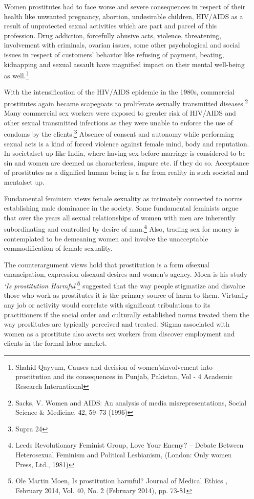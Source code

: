 \begin{multicols}{2}
\noi
Women prostitutes had to face worse and severe consequences in respect of their health like
unwanted pregnancy, abortion, undesirable children, HIV/AIDS as a result of unprotected
sexual activities which are part and parcel of this profession. Drug addiction, forcefully abusive
acts, violence, threatening, involvement with criminals, ovarian issues, some other
psychological and social issues in respect of customers' behavior like refusing of payment,
beating, kidnapping and sexual assault have magnified impact on their mental well-being as
well.\footnote{Shahid Qayyum, Causes and decision of women'sinvolvement into prostitution and its consequences in Punjab, Pakistan, Vol - 4 Academic Research International}

\noi
With the intensification of the HIV/AIDS epidemic in the 1980s, commercial prostitutes again
became scapegoats to proliferate sexually transmitted diseases.\footnote{Sacks, V. Women and AIDS: An analysis of media misrepresentations, Social Science \& Medicine, 42, 59–73 (1996)} Many commercial sex
workers were exposed to greater risk of HIV/AIDS and other sexual transmitted infections as
they were unable to enforce the use of condoms by the clients.\footnote{Supra 24} Absence of consent and
autonomy while performing sexual acts is a kind of forced violence against female mind, body
and reputation. In societalset up like India, where having sex before marriage is considered to
be sin and women are deemed as characterless, impure etc. if they do so. Acceptance of
prostitutes as a dignified human being is a far from reality in such societal and mentalset up.

\noi
Fundamental feminism views female sexuality as intimately connected to norms establishing
male dominance in the society. Some fundamental feminists argue that over the years all sexual
relationships of women with men are inherently subordinating and controlled by desire of
man.\footnote{Leeds Revolutionary Feminist Group, Love Your Enemy? – Debate Between Heterosexual Feminism and Political Lesbianism, (London: Only women Press, Ltd., 1981)} Also, trading sex for money is contemplated to be demeaning women and involve the unacceptable commodification of female sexuality.

\noi
The counterargument views hold that prostitution is a form ofsexual emancipation, expression
ofsexual desires and women’s agency. Moen is his study \textit{‘Is prostitution Harmful’}\footnote{ Ole Martin Moen, Is prostitution harmful? Journal of Medical Ethics , February 2014, Vol. 40, No. 2 (February 2014), pp. 73-81} suggested
that the way people stigmatize and disvalue those who work as prostitutes it is the primary
source of harm to them. Virtually any job or activity would correlate with significant
tribulations to its practitioners if the social order and culturally established norms treated them
the way prostitutes are typically perceived and treated. Stigma associated with women as a prostitute also averts sex workers from discover employment and clients in the formal labor market.


\end{multicols}
